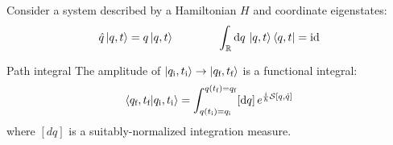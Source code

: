 Consider a system described by a Hamiltonian $ H $ and coordinate eigenstates:
\begin{equation}
  \hat q \ket{q,t} = q \ket{q,t}
  \qquad \qquad
  \int_{\mathbb{R}} \mathrm{d} q\, \ket{q,t} \bra{q,t} = \operatorname{id}
  \label{eq:coord-eigen}
\end{equation}

\begin{theorem}{Path integral}{}
  The amplitude of $ \ket{q_\text{i},t_\text{i}} \rightarrow \ket{q_\text{f},t_\text{f}} $ is a functional integral:
  \begin{equation}
    \braket{q_\text{f},t_\text{f} | q_\text{i},t_\text{i}} = \int_{q(t_\text{i}) = q_\text{i}}^{q(t_\text{f}) = q_\text{f}} [\mathrm{d} q]\, e^{\frac{i}{\hbar} \mathcal{S}[q,\dot q]}
  \end{equation}
  where $ [dq] $ is a suitably-normalized integration measure.
\end{theorem}

